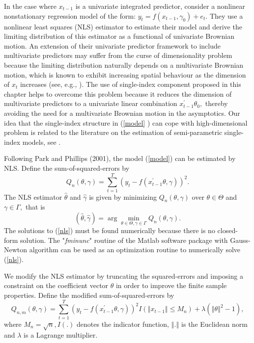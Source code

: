 \documentclass[12pt,a4paper]{article}
\begin{document}
In the case where $x_{t-1}$ is a univariate integrated
predictor, \cite{park2001nonlinear} consider a nonlinear nonstationary
regression model of the form: $y_{t}=f\left( x_{t-1},\gamma _{0}\right) +e_{t}.$
They use a nonlinear least squares (NLS) estimator to estimate their model
and derive the limiting distribution of this estimator as a functional of
univariate Brownian motion. An extension of their univariate predictor
framework to include multivariate predictors may suffer from the curse of
dimensionality problem because the limiting distribution naturally depends
on a multivariate Brownian motion, which is known to exhibit increasing
spatial behaviour as the dimension of $x_{t}$ increases (see, e.g., \cite{revuz2013continuous}). The use of single-index component proposed in this chapter
helps to overcome this problem because it reduces the dimension of
multivariate predictors to a univariate linear combination $x_{t-1}^{\prime
}\theta _{0},$ thereby avoiding the need for a multivariate Brownian motion
in the asymptotics. Our idea that the single-index structure in (\ref{model}%
) can cope with high-dimensional problem is related to the literature on the
estimation of semi-parametric single-index models, see \cite{zhou2018semiparametric}.

Following Park and Phillips (2001), the model (\ref{model}) can be estimated
by NLS. Define the sum-of-squared-errors by%
\[
Q_{n}\left( \theta ,\gamma \right) =\sum_{t=1}^{T}\left( y_{t}-f\left(
x_{t-1}^{\prime }\theta ,\gamma \right) \right) ^{2}. 
\]%
The NLS estimator $\hat{\theta}$ and $\hat{\gamma}$ is given by minimizing $%
Q_{n}\left( \theta ,\gamma \right) $ over $\theta \in \Theta $ and $\gamma
\in \Gamma ,$ that is%
\begin{equation}
\left( \hat{\theta},\hat{\gamma}\right) =\arg \min_{\theta \in \Theta
	,\gamma \in \Gamma }Q_{n}\left( \theta ,\gamma \right) .  \label{nls}
\end{equation}%
The solutions to (\ref{nls}) must be found numerically because there is no
closed-form solution. The "\textit{fminunc}" routine of the Matlab software
package with Gauss-Newton algorithm can be used as an optimization
routine to numerically solve (\ref{nls}).

We modify the NLS estimator by truncating the squared-errors and imposing a
constraint on the coefficient vector $\theta $ in order to improve the
finite sample properties. Define the modified sum-of-squared-errors by%
\begin{equation}
Q_{n,m}\left( \theta ,\gamma \right) =\sum_{t=1}^{T}\left( y_{t}-f\left(
x_{t-1}^{\prime }\theta ,\gamma \right) \right) ^{2}I\left( \left\Vert
x_{t-1}\right\Vert \leq M_{n}\right) +\lambda \left( \left\Vert \theta
\right\Vert ^{2}-1\right) ,  \label{mSSE}
\end{equation}%
where $M_{n}=\sqrt{n},I\left( .\right) $ denotes the indicator function, $%
\left\Vert .\right\Vert $ is the Euclidean norm and $\lambda $ is a Lagrange
multiplier.
\end{document}
